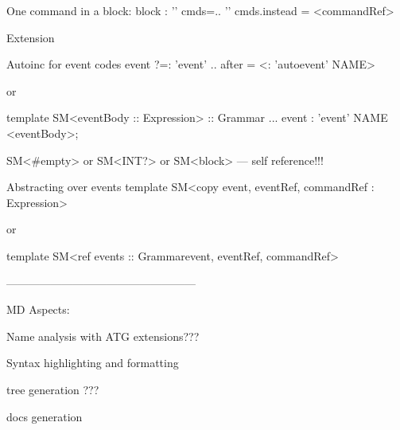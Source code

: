 One command in a block:
	block : '{' cmds=.. '}'
		cmds.instead = <commandRef>

Extension

Autoinc for event codes
	event ?=: 'event' ..
		after = <: 'autoevent' NAME>
		
	or 
	
	template SM<eventBody :: Expression> :: Grammar {
		...
		event : 'event' NAME <eventBody>;
	}
	
	SM<#empty> or SM<INT?> or SM<block> --- self reference!!!
	
Abstracting over events
	template SM<copy event, eventRef, commandRef : Expression>
	
	or
	
	template SM<ref events :: Grammar{event, eventRef, commandRef}>
	
	
---------------------------------------------------

MD Aspects:

Name analysis with ATG
	extensions???

Syntax highlighting and formatting

tree generation ???

docs generation

